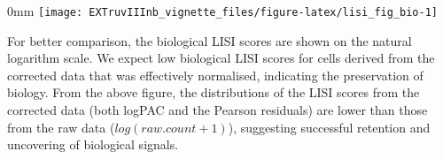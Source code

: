 \documentclass[]{article}
\newcommand{\hlnum}[1]{\textcolor[rgb]{0.816,0.125,0.439}{#1}}%
\newcommand{\hlstr}[1]{\textcolor[rgb]{0.251,0.627,0.251}{#1}}%
\newcommand{\hlcom}[1]{\textcolor[rgb]{0.502,0.502,0.502}{\textit{#1}}}%
\newcommand{\hlstd}[1]{\textcolor[rgb]{0.251,0.251,0.251}{#1}}%
\newcommand{\hlkwd}[1]{\textcolor[rgb]{0.878,0.439,0.125}{#1}}%
\newenvironment{Shaded}{\begin{myshaded}}{\end{myshaded}}
\newcommand{\DecValTok}[1]{\hlnum{#1}}
\newcommand{\SpecialCharTok}[1]{\hlstr{#1}}
\newcommand{\StringTok}[1]{\hlstr{#1}}
\newcommand{\DocumentationTok}[1]{\hlcom{#1}}
\newcommand{\OtherTok}[1]{{#1}}
\newcommand{\FunctionTok}[1]{\hlstd{#1}}
\newcommand{\ControlFlowTok}[1]{\hlkwd{#1}}
\newcommand{\NormalTok}[1]{\hlstd{#1}}
\begin{document}
\begin{adjustwidth}{\fltoffset}{0mm}
\texttt{[image: EXTruvIIInb\_vignette\_files/figure-latex/lisi\_fig\_bio-1]} \end{adjustwidth}

For better comparison, the biological LISI scores are shown on the natural logarithm scale. We expect low biological LISI scores for cells derived from the corrected data that was effectively normalised, indicating the preservation of biology. From the above figure, the distributions of the LISI scores from the corrected data (both logPAC and the Pearson residuals) are lower than those from the raw data (\(log(raw.count + 1)\)), suggesting successful retention and uncovering of biological signals.

\begin{Shaded}
\end{Shaded}
\end{document}

